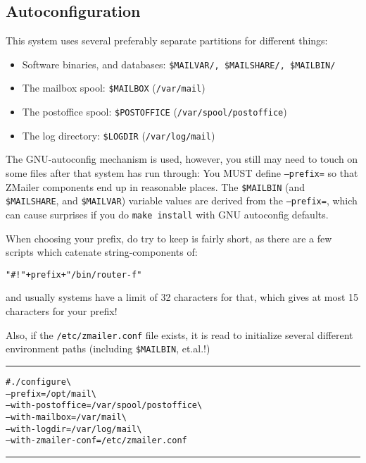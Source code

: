 \begin{multicols}{2}

\section{Autoconfiguration}%
%

This system uses several preferably separate partitions for
different things:%
%

\begin{itemize}
\item Software binaries, and databases: {\tt \$MAILVAR/, \$MAILSHARE/, \$MAILBIN/}
\item The mailbox spool: {\tt \$MAILBOX} ({\tt /var/mail})
\item The postoffice spool: {\tt \$POSTOFFICE} ({\tt /var/spool/postoffice})
\item The log directory: {\tt \$LOGDIR} ({\tt /var/log/mail})
\end{itemize}

The GNU-autoconfig mechanism is used, however, you still may need to
touch on some files after that system has run through:
You MUST define {\tt --prefix=} so that ZMailer components end up
in reasonable places.  The {\tt \$MAILBIN} (and {\tt \$MAILSHARE},
and {\tt \$MAILVAR}) variable values are derived from
the {\tt --prefix=}, which can cause surprises if you do
{\tt make install} with GNU autoconfig defaults.

When choosing your prefix, do try to keep is fairly short, as
there are a few scripts which catenate string-components of:%
\medskip\begin{alltt}
  "#! "+prefix+"/bin/router -f"
\end{alltt}\medskip%
and usually systems have a limit of 32 characters for that,
which gives at most 15 characters for your prefix!

Also, if the {\tt /etc/zmailer.conf} file exists, it is read
to initialize several different environment paths (including
{\tt \$MAILBIN}, et.al.!)

\begin{alltt}\small\hrule\medskip
# ./configure                             \verb/\/
  --prefix=/opt/mail                      \verb/\/
  --with-postoffice=/var/spool/postoffice \verb/\/
  --with-mailbox=/var/mail                \verb/\/
  --with-logdir=/var/log/mail             \verb/\/
  --with-zmailer-conf=/etc/zmailer.conf
\medskip\hrule\end{alltt}


\end{multicols}
